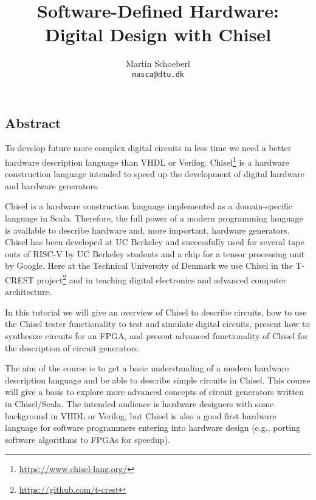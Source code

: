 \documentclass{article}
\begin{document}
\title{Software-Defined Hardware:\\ Digital Design with Chisel}

\author{Martin Schoeberl\\
\texttt{masca@dtu.dk}}


\maketitle \thispagestyle{empty}

\subsection*{Abstract}

To develop future more complex digital circuits in less time we need a better hardware description language than VHDL or Verilog. Chisel\footnote{\url{https://www.chisel-lang.org/}} is a hardware construction language intended to speed up the development of digital hardware and hardware generators.

Chisel is a hardware construction language implemented as a domain-specific language in Scala.
Therefore, the full power of a modern programming language is available to describe hardware and,
more important, hardware generators.
Chisel has been developed at UC Berkeley and successfully used for several tape outs of RISC-V
by UC Berkeley students and a chip for a tensor processing unit by Google.
Here at the Technical University of Denmark we use Chisel in the T-CREST project\footnote{\url{https://github.com/t-crest}} and in teaching digital electronics and advanced computer architecture.

In this tutorial we will give an overview of Chisel to describe circuits, how to use the Chisel tester functionality to test and simulate digital circuits, present how to synthesize circuits for an FPGA, and present advanced functionality of Chisel for the description of circuit generators.

The aim of the course is to get a basic understanding of a modern hardware description language and be able to describe simple circuits in Chisel. This course will give a basis to explore more advanced concepts of circuit generators written in Chisel/Scala. The intended audience is hardware designers with some background in VHDL or Verilog, but Chisel is also a good first hardware language for software programmers entering into hardware design (e.g., porting software algorithms to FPGAs for speedup).
\end{document}
